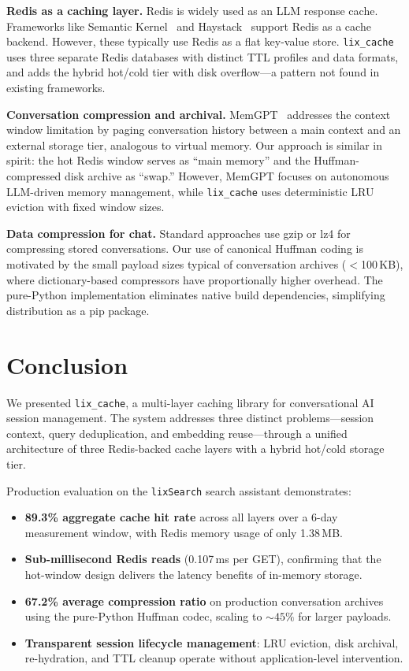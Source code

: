 \documentclass[conference]{IEEEtran}
\begin{document}
\textbf{Redis as a caching layer.}
Redis is widely used as an LLM response cache. Frameworks like Semantic Kernel~\cite{semantic_kernel2023} and Haystack~\cite{haystack2023} support Redis as a cache backend. However, these typically use Redis as a flat key-value store. \texttt{lix\_cache} uses three separate Redis databases with distinct TTL profiles and data formats, and adds the hybrid hot/cold tier with disk overflow---a pattern not found in existing frameworks.

\textbf{Conversation compression and archival.}
MemGPT~\cite{memgpt2023} addresses the context window limitation by paging conversation history between a main context and an external storage tier, analogous to virtual memory. Our approach is similar in spirit: the hot Redis window serves as ``main memory'' and the Huffman-compressed disk archive as ``swap.'' However, MemGPT focuses on autonomous LLM-driven memory management, while \texttt{lix\_cache} uses deterministic LRU eviction with fixed window sizes.

\textbf{Data compression for chat.}
Standard approaches use gzip or lz4 for compressing stored conversations. Our use of canonical Huffman coding is motivated by the small payload sizes typical of conversation archives ($<$100\,KB), where dictionary-based compressors have proportionally higher overhead. The pure-Python implementation eliminates native build dependencies, simplifying distribution as a pip package.

\section{Conclusion}
\label{sec:conclusion}

We presented \texttt{lix\_cache}, a multi-layer caching library for conversational AI session management. The system addresses three distinct problems---session context, query deduplication, and embedding reuse---through a unified architecture of three Redis-backed cache layers with a hybrid hot/cold storage tier.

Production evaluation on the \texttt{lixSearch} search assistant demonstrates:
\begin{itemize}
\item \textbf{89.3\% aggregate cache hit rate} across all layers over a 6-day measurement window, with Redis memory usage of only 1.38\,MB.
\item \textbf{Sub-millisecond Redis reads} (0.107\,ms per GET), confirming that the hot-window design delivers the latency benefits of in-memory storage.
\item \textbf{67.2\% average compression ratio} on production conversation archives using the pure-Python Huffman codec, scaling to ${\sim}45\%$ for larger payloads.
\item \textbf{Transparent session lifecycle management}: LRU eviction, disk archival, re-hydration, and TTL cleanup operate without application-level intervention.
\end{itemize}
\end{document}
